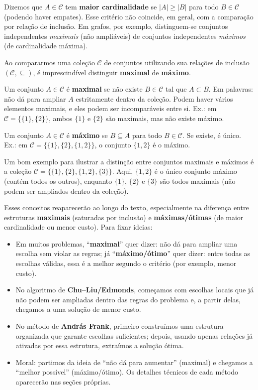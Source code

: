 Dizemos que \(A\in\mathcal{C}\) tem \textbf{maior cardinalidade} se \(|A|\ge |B|\) para todo \(B\in\mathcal{C}\) (podendo haver empates). Esse critério não coincide, em geral, com a comparação por relação de inclusão. Em grafos, por exemplo, distinguem-se conjuntos independentes \emph{maximais} (não ampliáveis) de conjuntos independentes \emph{máximos} (de cardinalidade máxima).


Ao compararmos uma coleção \(\mathcal{C}\) de conjuntos utilizando sua relações de inclusão \((\mathcal{C},\subseteq)\), é imprescindível distinguir \textbf{maximal} de \textbf{máximo}.


Um conjunto \(A\in\mathcal{C}\) é \textbf{maximal} se não existe \(B\in\mathcal{C}\) tal que \(A\subset B\). Em palavras: não dá para ampliar \(A\) estritamente dentro da coleção. Podem haver vários elementos maximais, e eles podem ser incomparáveis entre si. Ex.: em \(\mathcal{C}=\big\{\{1\},\{2\}\big\}\), ambos \(\{1\}\) e \(\{2\}\) são maximais, mas não existe máximo.


Um conjunto \(A\in\mathcal{C}\) é \textbf{máximo} se \(B\subseteq A\) para todo \(B\in\mathcal{C}\). Se existe, é único. Ex.: em \(\mathcal{C}=\big\{\{1\},\{2\},\{1,2\}\big\}\), o conjunto \(\{1,2\}\) é o máximo.


Um bom exemplo para ilustrar a distinção entre conjuntos maximais e máximos é a coleção \(\mathcal{C}=\big\{\{1\},\{2\},\{1,2\},\{3\}\big\}\). Aqui, \(\{1,2\}\) é o único conjunto máximo (contém todos os outros), enquanto \(\{1\}\), \(\{2\}\) e \(\{3\}\) são todos maximais (não podem ser ampliados dentro da coleção).


Esses conceitos reaparecerão ao longo do texto, especialmente na diferença entre estruturas \textbf{maximais} (saturadas por inclusão) e \textbf{máximas/ótimas} (de maior cardinalidade ou menor custo). Para fixar ideias:
\begin{itemize}
	\item Em muitos problemas, “\textbf{maximal}” quer dizer: não dá para ampliar uma escolha sem violar as regras; já “\textbf{máximo/ótimo}” quer dizer: entre todas as escolhas válidas, essa é a melhor segundo o critério (por exemplo, menor custo).
	\item No algoritmo de \textbf{Chu--Liu/Edmonds}, começamos com escolhas locais que já não podem ser ampliadas dentro das regras do problema e, a partir delas, chegamos a uma solução de menor custo.
	\item No método de \textbf{András Frank}, primeiro construímos uma estrutura organizada que garante escolhas suficientes; depois, usando apenas relações já ativadas por essa estrutura, extraímos a solução ótima.
	\item Moral: partimos da ideia de “não dá para aumentar” (maximal) e chegamos a “melhor possível” (máximo/ótimo). Os detalhes técnicos de cada método aparecerão nas seções próprias.
\end{itemize}

